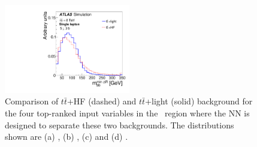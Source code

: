 \begin{figure}[tp]
\begin{center}
\includegraphics[width=0.49\textwidth]{Appendices/Figures_separation/mbb_mindR_5_flav.pdf}
\caption{Comparison of $t\bar{t}$+HF (dashed) and $t\bar{t}$+light (solid) background for the four top-ranked 
input variables in the \fivethree\ region where the NN is designed to separate these two backgrounds. 
The distributions shown are (a) \mbbmaxpt, (b) \whadmass, (c)  \whadpt and (d) \mbbmindr.
}
\label{fig:sepinput_lj_0} 
\end{center}
\end{figure}

